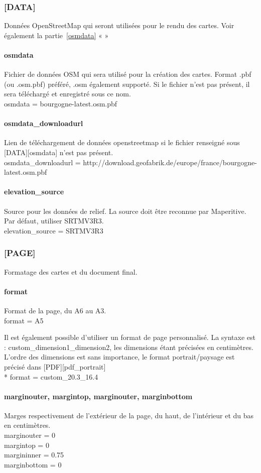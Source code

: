 \documentclass[12pt,french]{article}
\begin{document}
\subsubsection{[DATA]}
Données OpenStreetMap qui seront utilisées pour le rendu des cartes. Voir également la partie~\ref{osmdata} «  »
\paragraph{osmdata} Fichier de données OSM qui sera utilisé pour la création des cartes. Format .pbf (ou .osm.pbf) préféré, .osm également supporté. Si le fichier n'est pas présent, il sera téléchargé et enregistré sous ce nom.\\
osmdata = bourgogne-latest.osm.pbf
\paragraph{osmdata\_downloadurl} Lien de téléchargement de données openstreetmap si le fichier renseigné sous [DATA][osmdata] n'est pas présent.\\
osmdata\_downloadurl = http://download.geofabrik.de/europe/france/bourgogne-latest.osm.pbf
\paragraph{elevation\_source} Source pour les données de relief. La source doit être reconnue par Maperitive. Par défaut, utiliser SRTMV3R3.\\
elevation\_source = SRTMV3R3

\subsubsection{[PAGE]}
Formatage des cartes et du document final.
\paragraph{format} Format de la page, du A6 au A3.\\
format = A5 \par
Il est également possible d'utiliser un format de page personnalisé. La syntaxe est : custom\_dimension1\_dimension2, les dimensions étant précisées en centimètres. L'ordre des dimensions est sans importance, le format portrait/paysage est précisé dans [PDF][pdf\_portrait] \\*
format = custom\_20.3\_16.4

\paragraph{marginouter, margintop, marginouter, marginbottom} Marges respectivement de l'extérieur de la page, du haut, de l'intérieur et du bas en centimètres.\\
marginouter = 0\\
margintop = 0\\
margininner = 0.75\\
marginbottom = 0
\end{document}
